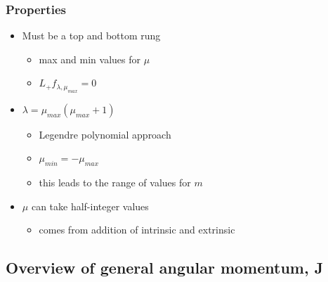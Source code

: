 \documentclass[a4paper,11pt,normalem]{article}
\begin{document}
\subsubsection{Properties}\label{properties}

\begin{itemize}
\item
  Must be a top and bottom rung
  \begin{itemize}
  \item
    max and min values for \(\mu\)
  \item
    \(L_+ f_{\lambda, \mu_{max}} = 0\)
  \end{itemize}
\item
  \(\lambda = \mu_{max} (\mu_{max} + 1)\)
  \begin{itemize}
  \item
    Legendre polynomial approach
  \item
    \(\mu_{min} = -\mu_{max}\)
  \item
    this leads to the range of values for \(m\)
  \end{itemize}
\item
  \(\mu\) can take half-integer values
  \begin{itemize}
  \item
    comes from addition of intrinsic and extrinsic
  \end{itemize}
\end{itemize}

\subsection{Overview of general angular momentum, J}\label{overview-of-general-angular-momentum-j}
\end{document}
